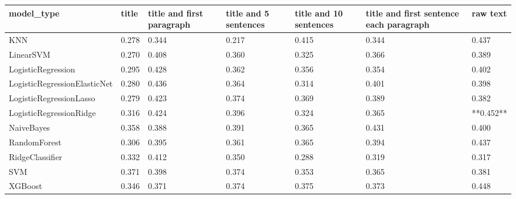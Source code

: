 \begin{tabular}{lllllll}
\toprule
                  model\_type & title & title and first paragraph & title and 5 sentences & title and 10 sentences & title and first sentence each paragraph &  raw text \\
\midrule
                         KNN & 0.278 &                     0.344 &                 0.217 &                  0.415 &                                   0.344 &     0.437 \\
                   LinearSVM & 0.270 &                     0.408 &                 0.360 &                  0.325 &                                   0.366 &     0.389 \\
          LogisticRegression & 0.295 &                     0.428 &                 0.362 &                  0.356 &                                   0.354 &     0.402 \\
LogisticRegressionElasticNet & 0.280 &                     0.436 &                 0.364 &                  0.314 &                                   0.401 &     0.398 \\
     LogisticRegressionLasso & 0.279 &                     0.423 &                 0.374 &                  0.369 &                                   0.389 &     0.382 \\
     LogisticRegressionRidge & 0.316 &                     0.424 &                 0.396 &                  0.324 &                                   0.365 & **0.452** \\
                  NaiveBayes & 0.358 &                     0.388 &                 0.391 &                  0.365 &                                   0.431 &     0.400 \\
                RandomForest & 0.306 &                     0.395 &                 0.361 &                  0.365 &                                   0.394 &     0.437 \\
             RidgeClassifier & 0.332 &                     0.412 &                 0.350 &                  0.288 &                                   0.319 &     0.317 \\
                         SVM & 0.371 &                     0.398 &                 0.374 &                  0.353 &                                   0.365 &     0.381 \\
                     XGBoost & 0.346 &                     0.371 &                 0.374 &                  0.375 &                                   0.373 &     0.448 \\
\bottomrule
\end{tabular}
